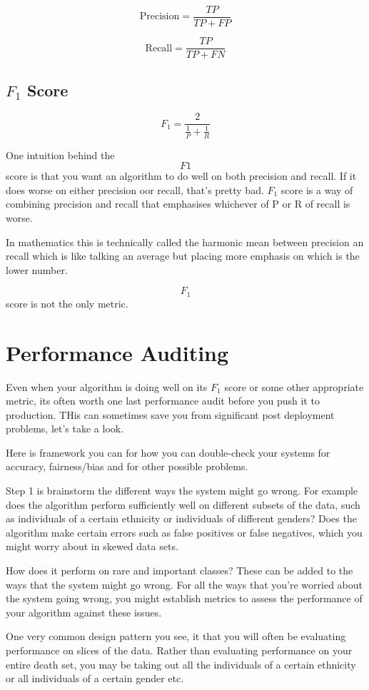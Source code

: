 \[
    \text{Precision} = \frac{{TP}}{{TP} + {FP}}
\]

\[
    \text{Recall} = \frac{{TP}}{{TP} + {FN}}
\]


\subsection{$F_{1}$ Score}

\[
    F_1 = \frac{2}{\frac{1}{{P}} + \frac{1}{{R}}}
\]

One intuition behind the $$F1$$ score is that you want an algorithm to do well on both precision and recall.
If it does worse on either precision oor recall, that's pretty bad.
$F_1$ score is a way of combining precision and recall that emphasises whichever of P or R of recall is worse.

In mathematics this is technically called the harmonic mean between precision an recall which is like talking an average but placing more emphasis on which is the lower number.

$$F_1$$ score is not the only metric.

\section{Performance Auditing}

Even when your algorithm is doing well on its $F_1$ score or some other appropriate metric, its often worth one last performance audit before you push it to production.
THis can sometimes save you from significant post deployment problems, let's take a look.

Here is framework you can for how you can double-check your systems for accuracy, fairness/bias and for other possible problems.

Step 1 is brainstorm the different ways the system might go wrong.
For example does the algorithm perform sufficiently well on different subsets of the data, such as individuals of a certain ethnicity or individuals of different genders?
Does the algorithm make certain errors such as false positives or false negatives, which you might worry about in skewed data sets.

How does it perform on rare and important classes?
These can be added to the ways that the system might go wrong.
For all the ways that you're worried about the system going wrong, you might establish metrics to assess the performance of your algorithm against these issues.

One very common design pattern you see, it that you will often be evaluating performance on slices of the data.
Rather than evaluating performance on your entire death set, you may be taking out all the individuals of a certain ethnicity or all individuals of a certain gender etc.

